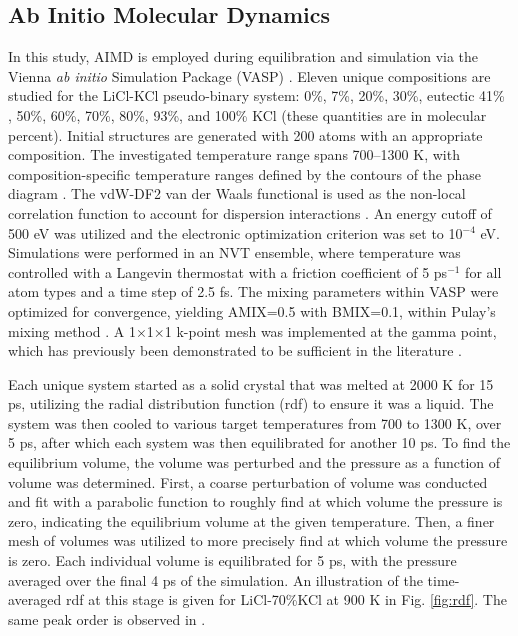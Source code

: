 \documentclass[review]{elsarticle}
\begin{document}
\subsection{Ab Initio Molecular Dynamics}
In this study, AIMD is employed during equilibration and simulation via the Vienna \textit{ab initio} Simulation Package (VASP) \cite{Kresse1993,Kresse1996,Kresse1996a}. Eleven unique compositions are studied for the LiCl-KCl pseudo-binary system: 0\%, 7\%, 20\%, 30\%,  eutectic 41\% \cite{Zhou2017}, 50\%, 60\%, 70\%, 80\%, 93\%, and 100\% KCl (these quantities are in molecular percent). Initial structures are generated with 200 atoms with an appropriate composition. The investigated temperature range spans 700–1300 K, with composition-specific temperature ranges defined by the contours of the phase diagram \cite{Zhou2017}.  The vdW-DF2 van der Waals functional is used as the non-local correlation function to account for dispersion interactions \cite{Dion2004}. An energy cutoff of 500 eV was utilized and the electronic optimization criterion was set to 10$^{-4}$ eV. Simulations were performed in an NVT ensemble, where temperature was controlled with a Langevin thermostat with a friction coefficient of 5 ps$^{-1}$ for all atom types and a time step of 2.5 fs. The mixing parameters within VASP were optimized for convergence, yielding AMIX=0.5 with BMIX=0.1, within Pulay’s mixing method \cite{PULAY1980393}. A 1$\times$1$\times$1 k-point mesh was implemented at the gamma point, which has previously been demonstrated to be sufficient in the literature \cite{Bengston2014,Song2017}.

Each unique system started as a solid crystal that was melted at 2000 K for 15 ps, utilizing the radial distribution function (rdf) to ensure it was a liquid. The system was then cooled to various target temperatures from 700 to 1300 K, over 5 ps, after which each system was then equilibrated for another 10 ps. To find the equilibrium volume, the volume was perturbed and the pressure as a function of volume was determined. First, a coarse perturbation of volume was conducted and fit with a parabolic function to roughly find at which volume the pressure is zero, indicating the equilibrium volume at the given temperature. Then, a finer mesh of volumes was utilized to more precisely find at which volume the pressure is zero. Each individual volume is equilibrated for 5 ps, with the pressure averaged over the final 4 ps of the simulation. An illustration of the time-averaged rdf at this stage is given for LiCl-70\%KCl at 900 K in Fig. \ref{fig:rdf}. The same peak order is observed in \cite{Bengston2014,WANG2019}.
\end{document}
